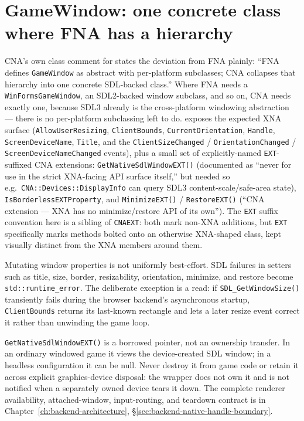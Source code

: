\section{GameWindow: one concrete class where FNA has a hierarchy}
\label{sec:gamewindow}

CNA's own class comment for  states the deviation from FNA plainly:
``FNA defines \texttt{GameWindow} as abstract with per-platform subclasses; CNA collapses
that hierarchy into one concrete SDL-backed class.'' Where FNA needs a
\texttt{WinFormsGameWindow}, an SDL2-backed window subclass, and so on, CNA needs exactly one,
because SDL3 already is the cross-platform windowing abstraction --- there is no per-platform
subclassing left to do.  exposes the expected XNA surface
(\texttt{AllowUserResizing}, \texttt{ClientBounds}, \texttt{CurrentOrientation},
\texttt{Handle}, \texttt{ScreenDeviceName}, \texttt{Title}, and the
\texttt{ClientSizeChanged} / \texttt{OrientationChanged} / \texttt{ScreenDeviceNameChanged}
events), plus a small set of explicitly-named \texttt{EXT}-suffixed CNA extensions:
\texttt{GetNativeSdlWindowEXT()} (documented as ``never for use in the strict XNA-facing API
surface itself,'' but needed so e.g.\ \texttt{CNA::Devices::DisplayInfo} can query SDL3
content-scale/safe-area state), \texttt{IsBorderlessEXTProperty}, and
\texttt{MinimizeEXT()} / \texttt{RestoreEXT()} (``CNA extension --- XNA has no minimize/restore
API of its own''). The \texttt{EXT} suffix convention here is a sibling of \texttt{CNAEXT}: both
mark non-XNA additions, but \texttt{EXT} specifically marks methods bolted onto an otherwise
XNA-shaped class, kept visually distinct from the XNA members around them.

Mutating window properties is not uniformly best-effort. SDL failures in setters such as title,
size, border, resizability, orientation, minimize, and restore become
\texttt{std::runtime\_error}. The deliberate exception is a read: if
\texttt{SDL\_GetWindowSize()} transiently fails during the browser backend's asynchronous startup,
\texttt{ClientBounds} returns its last-known rectangle and lets a later resize event correct it
rather than unwinding the game loop.

\texttt{GetNativeSdlWindowEXT()} is a borrowed pointer, not an ownership transfer. In an ordinary
windowed game it views the device-created SDL window; in a headless configuration it can be null.
Never destroy it from game code or retain it across explicit graphics-device disposal: the wrapper
does not own it and is not notified when a separately owned device tears it down. The complete
renderer availability, attached-window, input-routing, and teardown contract is in
Chapter~\ref{ch:backend-architecture}, \S\ref{sec:backend-native-handle-boundary}.

